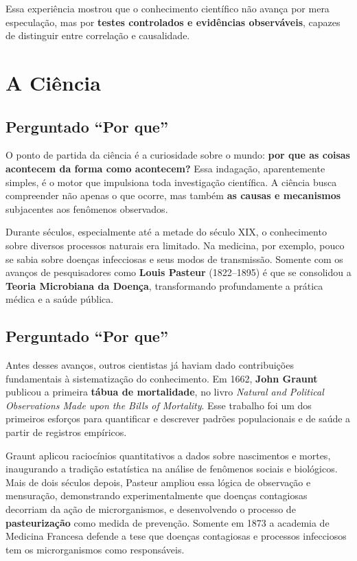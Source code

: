 \documentclass[
  letterpaper,
  DIV=11,
  numbers=noendperiod]{scrreprt}
\begin{document}
Essa experiência mostrou que o conhecimento científico não avança por
mera especulação, mas por \textbf{testes controlados e evidências
observáveis}, capazes de distinguir entre correlação e causalidade.

\section{A Ciência}\label{a-ciuxeancia}

\subsection{Perguntado ``Por que''}\label{perguntado-por-que}

O ponto de partida da ciência é a curiosidade sobre o mundo: \textbf{por
que as coisas acontecem da forma como acontecem?} Essa indagação,
aparentemente simples, é o motor que impulsiona toda investigação
científica. A ciência busca compreender não apenas o que ocorre, mas
também \textbf{as causas e mecanismos} subjacentes aos fenômenos
observados.

Durante séculos, especialmente até a metade do século XIX, o
conhecimento sobre diversos processos naturais era limitado. Na
medicina, por exemplo, pouco se sabia sobre doenças infecciosas e seus
modos de transmissão. Somente com os avanços de pesquisadores como
\textbf{Louis Pasteur} (1822--1895) é que se consolidou a \textbf{Teoria
Microbiana da Doença}, transformando profundamente a prática médica e a
saúde pública.

\subsection{Perguntado ``Por que''}\label{perguntado-por-que-1}

Antes desses avanços, outros cientistas já haviam dado contribuições
fundamentais à sistematização do conhecimento. Em 1662, \textbf{John
Graunt} publicou a primeira \textbf{tábua de mortalidade}, no livro
\emph{Natural and Political Observations Made upon the Bills of
Mortality}. Esse trabalho foi um dos primeiros esforços para quantificar
e descrever padrões populacionais e de saúde a partir de registros
empíricos.

Graunt aplicou raciocínios quantitativos a dados sobre nascimentos e
mortes, inaugurando a tradição estatística na análise de fenômenos
sociais e biológicos. Mais de dois séculos depois, Pasteur ampliou essa
lógica de observação e mensuração, demonstrando experimentalmente que
doenças contagiosas decorriam da ação de microrganismos, e desenvolvendo
o processo de \textbf{pasteurização} como medida de prevenção. Somente
em 1873 a academia de Medicina Francesa defende a tese que doenças
contagiosas e processos infecciosos tem os microrganismos como
responsáveis.
\end{document}
